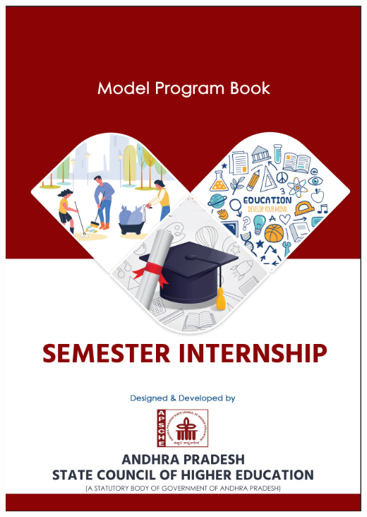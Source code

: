 \documentclass{article} %
\begin{document}


\noindent 

\noindent 

\noindent 

\noindent 

\noindent \includegraphics*[width=7.13in, height=11.74in]{image1}\eject 
\end{document}
